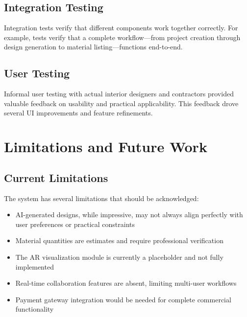 \documentclass[conference]{IEEEtran}
\begin{document}
\subsection{Integration Testing}
Integration tests verify that different components work together correctly. For example, tests verify that a complete workflow—from project creation through design generation to material listing—functions end-to-end.

\subsection{User Testing}
Informal user testing with actual interior designers and contractors provided valuable feedback on usability and practical applicability. This feedback drove several UI improvements and feature refinements.

\section{Limitations and Future Work}

\subsection{Current Limitations}
The system has several limitations that should be acknowledged:
\begin{itemize}
    \item AI-generated designs, while impressive, may not always align perfectly with user preferences or practical constraints
    \item Material quantities are estimates and require professional verification
    \item The AR visualization module is currently a placeholder and not fully implemented
    \item Real-time collaboration features are absent, limiting multi-user workflows
    \item Payment gateway integration would be needed for complete commercial functionality
\end{itemize}
\end{document}

